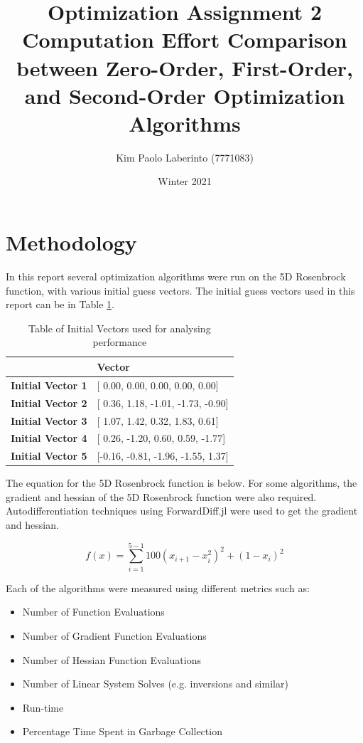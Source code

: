 \documentclass{article}
\title{Optimization Assignment 2\\Computation Effort Comparison between Zero-Order, First-Order, and Second-Order Optimization Algorithms}
\date{Winter 2021}
\author{Kim Paolo Laberinto (7771083)}
\begin{document}
    \maketitle
    \newpage

    \tableofcontents
    \newpage


    \section{Methodology}

    In this report several optimization algorithms were run on the 5D Rosenbrock function, with various initial guess vectors.
    The initial guess vectors used in this report can be in Table \ref{tab:initial_vectors}. 

    \begin{table}[H]
        \centering
        \begin{tabular}{@{}ll@{}}
        \toprule
                                  & \textbf{Vector}                     \\ \midrule
        \textbf{Initial Vector 1} & [ 0.00,  0.00,  0.00,  0.00,  0.00] \\
        \textbf{Initial Vector 2} & [ 0.36,  1.18, -1.01, -1.73, -0.90] \\
        \textbf{Initial Vector 3} & [ 1.07,  1.42,  0.32,  1.83,  0.61] \\
        \textbf{Initial Vector 4} & [ 0.26, -1.20,  0.60,  0.59, -1.77] \\
        \textbf{Initial Vector 5} & [-0.16, -0.81, -1.96, -1.55,  1.37] \\ \bottomrule
        \end{tabular}
        \caption{Table of Initial Vectors used for analysing performance}
        \label{tab:initial_vectors}
    \end{table}

    The equation for the 5D Rosenbrock function is below. 
    For some algorithms, the gradient and hessian of the 5D Rosenbrock function were also required.
    Autodifferentiation techniques using ForwardDiff.jl were used to get the gradient and hessian.

    \begin{equation}
        f(x) = \sum_{i = 1}^{5 - 1} 100(x_{i+1} - x_i^2)^2 + (1-x_i)^2
    \end{equation}

    Each of the algorithms were measured using different metrics such as:
    \begin{itemize}
        \item Number of Function Evaluations
        \item Number of Gradient Function Evaluations
        \item Number of Hessian Function Evaluations
        \item Number of Linear System Solves (e.g. inversions and similar)
        \item Run-time
        \item Percentage Time Spent in Garbage Collection
    \end{itemize}
\end{document}
